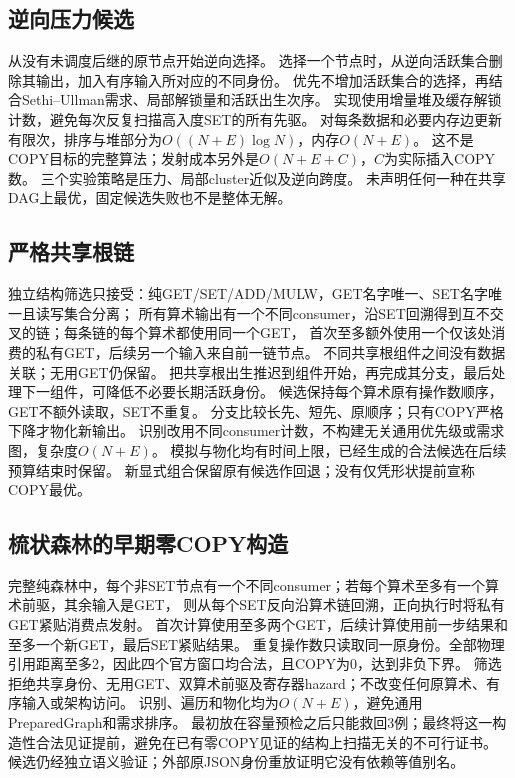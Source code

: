 \documentclass[UTF8,11pt,a4paper]{ctexart}
\begin{document}
\subsection{逆向压力候选}
从没有未调度后继的原节点开始逆向选择。
选择一个节点时，从逆向活跃集合删除其输出，加入有序输入所对应的不同身份。
优先不增加活跃集合的选择，再结合Sethi--Ullman需求、局部解锁量和活跃出生次序。
实现使用增量堆及缓存解锁计数，避免每次反复扫描高入度SET的所有先驱。
对每条数据和必要内存边更新有限次，排序与堆部分为$O((N+E)\log N)$，内存$O(N+E)$。
这不是COPY目标的完整算法；发射成本另外是$O(N+E+C)$，$C$为实际插入COPY数。
三个实验策略是压力、局部cluster近似及逆向跨度。
未声明任何一种在共享DAG上最优，固定候选失败也不是整体无解。

\subsection{严格共享根链}
独立结构筛选只接受：纯GET/SET/ADD/MULW，GET名字唯一、SET名字唯一且读写集合分离；
所有算术输出有一个不同consumer，沿SET回溯得到互不交叉的链；每条链的每个算术都使用同一个GET，
首次至多额外使用一个仅该处消费的私有GET，后续另一个输入来自前一链节点。
不同共享根组件之间没有数据关联；无用GET仍保留。
把共享根出生推迟到组件开始，再完成其分支，最后处理下一组件，可降低不必要长期活跃身份。
候选保持每个算术原有操作数顺序，GET不额外读取，SET不重复。
分支比较长先、短先、原顺序；只有COPY严格下降才物化新输出。
识别改用不同consumer计数，不构建无关通用优先级或需求图，复杂度$O(N+E)$。
模拟与物化均有时间上限，已经生成的合法候选在后续预算结束时保留。
新显式组合保留原有候选作回退；没有仅凭形状提前宣称COPY最优。

\subsection{梳状森林的早期零COPY构造}
完整纯森林中，每个非SET节点有一个不同consumer；若每个算术至多有一个算术前驱，其余输入是GET，
则从每个SET反向沿算术链回溯，正向执行时将私有GET紧贴消费点发射。
首次计算使用至多两个GET，后续计算使用前一步结果和至多一个新GET，最后SET紧贴结果。
重复操作数只读取同一原身份。全部物理引用距离至多2，因此四个官方窗口均合法，且COPY为0，达到非负下界。
筛选拒绝共享身份、无用GET、双算术前驱及寄存器hazard；不改变任何原算术、有序输入或架构访问。
识别、遍历和物化均为$O(N+E)$，避免通用PreparedGraph和需求排序。
最初放在容量预检之后只能救回3例；最终将这一构造性合法见证提前，避免在已有零COPY见证的结构上扫描无关的不可行证书。
候选仍经独立语义验证；外部原JSON身份重放证明它没有依赖等值别名。
\end{document}
